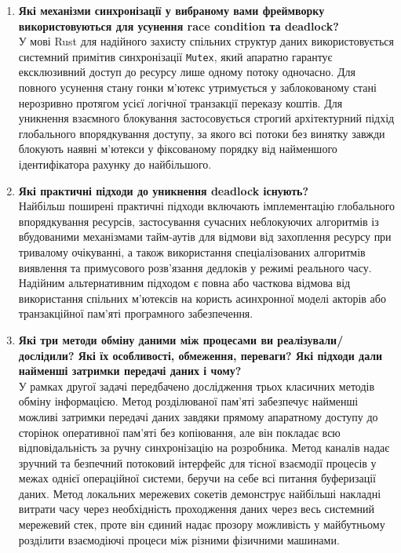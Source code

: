 \documentclass[14pt, a4paper]{extreport}
\begin{document}
\begin{enumerate}
		\item \textbf{Які механізми синхронізації у вибраному вами фреймворку використовуються для усунення race condition та deadlock?} \\ У мові Rust для надійного захисту спільних структур даних використовується системний примітив синхронізації \texttt{Mutex}, який апаратно гарантує ексклюзивний доступ до ресурсу лише одному потоку одночасно. Для повного усунення стану гонки м'ютекс утримується у заблокованому стані нерозривно протягом усієї логічної транзакції переказу коштів. Для уникнення взаємного блокування застосовується строгий архітектурний підхід глобального впорядкування доступу, за якого всі потоки без винятку завжди блокують наявні м'ютекси у фіксованому порядку від найменшого ідентифікатора рахунку до найбільшого.
		
		\item \textbf{Які практичні підходи до уникнення deadlock існують?} \\ Найбільш поширені практичні підходи включають імплементацію глобального впорядкування ресурсів, застосування сучасних неблокуючих алгоритмів із вбудованими механізмами тайм-аутів для відмови від захоплення ресурсу при тривалому очікуванні, а також використання спеціалізованих алгоритмів виявлення та примусового розв'язання дедлоків у режимі реального часу. Надійним альтернативним підходом є повна або часткова відмова від використання спільних м'ютексів на користь асинхронної моделі акторів або транзакційної пам'яті програмного забезпечення.
		
		\item \textbf{Які три методи обміну даними між процесами ви реалізували/дослідили? Які їх особливості, обмеження, переваги? Які підходи дали найменші затримки передачі даних і чому?} \\ У рамках другої задачі передбачено дослідження трьох класичних методів обміну інформацією. Метод розділюваної пам'яті забезпечує найменші можливі затримки передачі даних завдяки прямому апаратному доступу до сторінок оперативної пам'яті без копіювання, але він покладає всю відповідальність за ручну синхронізацію на розробника. Метод каналів надає зручний та безпечний потоковий інтерфейс для тісної взаємодії процесів у межах однієї операційної системи, беручи на себе всі питання буферизації даних. Метод локальних мережевих сокетів демонструє найбільші накладні витрати часу через необхідність проходження даних через весь системний мережевий стек, проте він єдиний надає прозору можливість у майбутньому розділити взаємодіючі процеси між різними фізичними машинами.
	\end{enumerate}
	
\end{document}
